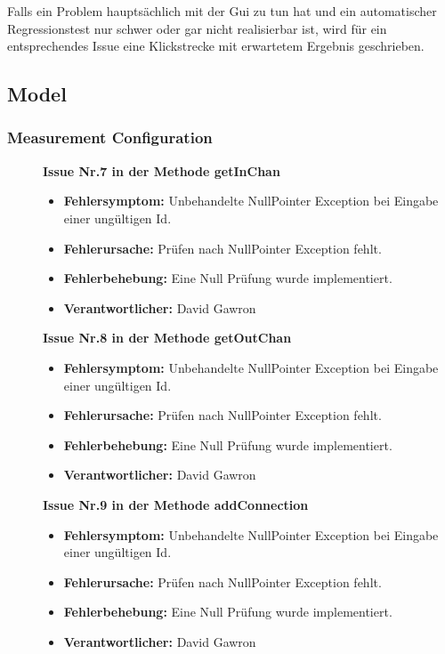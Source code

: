 \documentclass[parskip=full]{scrartcl}
\begin{document}
Falls ein Problem hauptsächlich mit der Gui zu tun hat und ein automatischer Regressionstest nur schwer oder gar nicht realisierbar ist, wird für ein entsprechendes Issue eine Klickstrecke mit erwartetem Ergebnis geschrieben.

\clearpage
\subsection{Model}
\subsubsection{Measurement Configuration}

\begin{description}
 

\item []\textbf{Issue Nr.7 in der Methode getInChan} 

\begin{itemize}
\item []\textbf{Fehlersymptom:} Unbehandelte NullPointer Exception bei Eingabe einer ungültigen Id.
\item []\textbf{Fehlerursache:} Prüfen nach NullPointer Exception fehlt.
\item []\textbf{Fehlerbehebung:} Eine Null Prüfung wurde implementiert.
\item []\textbf{Verantwortlicher:} David Gawron
\end{itemize}

\item []\textbf{Issue Nr.8 in der Methode getOutChan} 

\begin{itemize}
\item []\textbf{Fehlersymptom:} Unbehandelte NullPointer Exception bei Eingabe einer ungültigen Id.
\item []\textbf{Fehlerursache:} Prüfen nach NullPointer Exception fehlt.
\item []\textbf{Fehlerbehebung:} Eine Null Prüfung wurde implementiert.
\item []\textbf{Verantwortlicher:} David Gawron
\end{itemize}

\item []\textbf{Issue Nr.9 in der Methode addConnection} 

\begin{itemize}
\item []\textbf{Fehlersymptom:} Unbehandelte NullPointer Exception bei Eingabe einer ungültigen Id.
\item []\textbf{Fehlerursache:} Prüfen nach NullPointer Exception fehlt.
\item []\textbf{Fehlerbehebung:} Eine Null Prüfung wurde implementiert.
\item []\textbf{Verantwortlicher:} David Gawron
\end{itemize}


\end{description}
\end{document}
